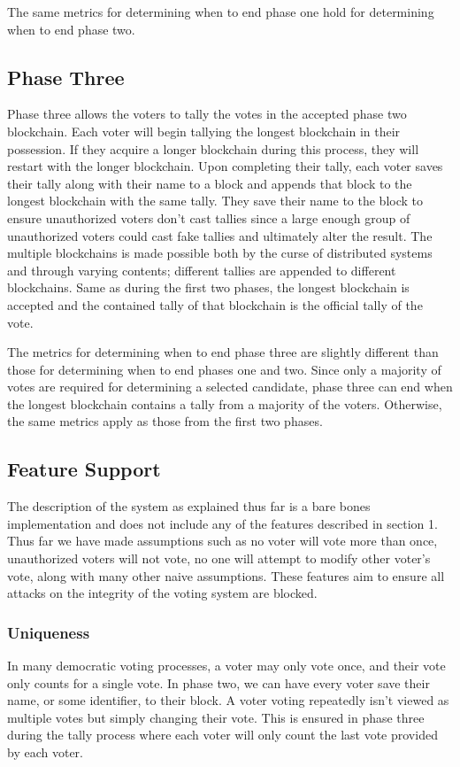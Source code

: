 \documentclass[conference]{IEEEtran}
\begin{document}
The same metrics for determining when to end phase one hold for determining when to end phase two. 

\subsection{Phase Three}
Phase three allows the voters to tally the votes in the accepted phase two blockchain. Each voter will begin tallying the longest blockchain in their possession. If they acquire a longer blockchain during this process, they will restart with the longer blockchain. Upon completing their tally, each voter saves their tally along with their name to a block and appends that block to the longest blockchain with the same tally. They save their name to the block to ensure unauthorized voters don't cast tallies since a large enough group of unauthorized voters could cast fake tallies and ultimately alter the result. The multiple blockchains is made possible both by the curse of distributed systems and through varying contents; different tallies are appended to different blockchains. Same as during the first two phases, the longest blockchain is accepted and the contained tally of that blockchain is the official tally of the vote.

The metrics for determining when to end phase three are slightly different than those for determining when to end phases one and two. Since only a majority of votes are required for determining a selected candidate, phase three can end when the longest blockchain contains a tally from a majority of the voters. Otherwise, the same metrics apply as those from the first two phases. 

\subsection{Feature Support}
The description of the system as explained thus far is a bare bones implementation and does not include any of the features described in section 1. Thus far we have made assumptions such as no voter will vote more than once, unauthorized voters will not vote, no one will attempt to modify other voter's vote, along with many other naive assumptions. These features aim to ensure all attacks on the integrity of the voting system are blocked.

\subsubsection{Uniqueness}
In many democratic voting processes, a voter may only vote once, and their vote only counts for a single vote. In phase two, we can have every voter save their name, or some identifier, to their block. A voter voting repeatedly isn't viewed as multiple votes but simply changing their vote. This is ensured in phase three during the tally process where each voter will only count the last vote provided by each voter. 
\end{document}
